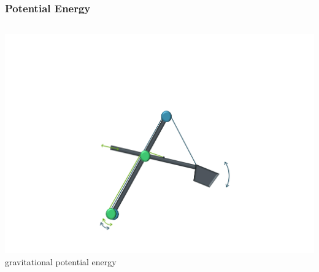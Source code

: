 \begin{frame}
	\frametitle{Potential Energy}
	\begin{columns}
		\centering
		\includegraphics[trim=30cm 5cm 30cm 23cm, clip=true, width=\linewidth]{img/Excavator_Only}
		gravitational potential energy
	\end{columns}
\end{frame}


